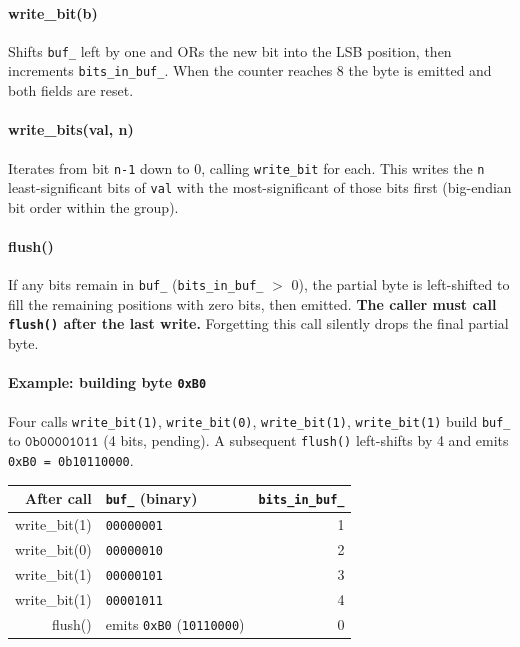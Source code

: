 \paragraph{write\_bit(b)}
Shifts \texttt{buf\_} left by one and ORs the new bit into the LSB position, then
increments \texttt{bits\_in\_buf\_}.
When the counter reaches 8 the byte is emitted and both fields are reset.

\paragraph{write\_bits(val, n)}
Iterates from bit \texttt{n-1} down to 0, calling \texttt{write\_bit} for each.
This writes the \texttt{n} least-significant bits of \texttt{val} with the most-significant
of those bits first (big-endian bit order within the group).

\paragraph{flush()}
If any bits remain in \texttt{buf\_} (\texttt{bits\_in\_buf\_} $>$ 0), the partial byte is
left-shifted to fill the remaining positions with zero bits, then emitted.
\textbf{The caller must call \texttt{flush()} after the last write.}
Forgetting this call silently drops the final partial byte.

\paragraph{Example: building byte \texttt{0xB0}}
Four calls \texttt{write\_bit(1)}, \texttt{write\_bit(0)}, \texttt{write\_bit(1)},
\texttt{write\_bit(1)} build \texttt{buf\_} to $\mathtt{0b00001011}$ (4 bits, pending).
A subsequent \texttt{flush()} left-shifts by 4 and emits \texttt{0xB0 = 0b10110000}.

\begin{center}
\begin{tabular}{r l r}
\toprule
\textbf{After call} & \textbf{\texttt{buf\_} (binary)} & \textbf{\texttt{bits\_in\_buf\_}} \\
\midrule
write\_bit(1) & \texttt{00000001} & 1 \\
write\_bit(0) & \texttt{00000010} & 2 \\
write\_bit(1) & \texttt{00000101} & 3 \\
write\_bit(1) & \texttt{00001011} & 4 \\
flush()       & emits \texttt{0xB0} (\texttt{10110000}) & 0 \\
\bottomrule
\end{tabular}
\end{center}

